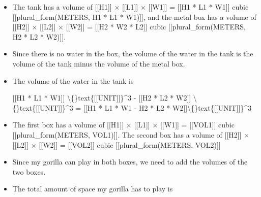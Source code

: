 \documentclass{article}
\begin{document}
{{\begin{itemize}
                        One solution would be:
                        ([[getPrimeFactorization(WIDTH).join("\textbackslash\{\}\textbackslash\{\}space\textbackslash\{\}\textbackslash\{\}color\{black\}\{\textbackslash\{\}$\times$\}\textbackslash\{\}\textbackslash\{\}space")]]),
                        ([[getPrimeFactorization(LENGTH).join("\textbackslash\{\}\textbackslash\{\}space\textbackslash\{\}\textbackslash\{\}color\{black\}\{\textbackslash\{\}$\times$\}\textbackslash\{\}\textbackslash\{\}space")]]) and
                        ([[getPrimeFactorization(HEIGHT).join("\textbackslash\{\}\textbackslash\{\}space\textbackslash\{\}\textbackslash\{\}color\{black\}\{\textbackslash\{\}$\times$\}\textbackslash\{\}\textbackslash\{\}space")]])
                    
                    
                        So the dimensions of the box could be [[WIDTH]],
                        [[LENGTH]] and [[HEIGHT]].
  \item The tank has a volume of [[H1]] $\times$ [[L1]] $\times$ [[W1]] = 
                        [[H1 * L1 * W1]] cubic [[plural\_form(METERS, H1 * L1 * W1)]],
                        and the metal box has a volume of [[H2]] $\times$ [[L2]] $\times$ [[W2]] = 
                        [[H2 * W2 * L2]] cubic [[plural\_form(METERS, H2 * L2 * W2)]].
  \item Since there is no water in the box, the volume of the water in the tank is the volume of the tank minus the volume of the metal box.
  \item The volume of the water in the tank is 
                    
                        [[H1 * L1 * W1]] \textbackslash\{\}text\{[[UNIT]]\}\textasciicircum{}3 -
                        [[H2 * L2 * W2]] \textbackslash\{\}text\{[[UNIT]]\}\textasciicircum{}3 = 
                        [[H1 * L1 * W1 - H2 * L2 * W2]]\textbackslash\{\}text\{[[UNIT]]\}\textasciicircum{}3
  \item The first box has a volume of [[H1]] $\times$ [[L1]] $\times$ [[W1]] = 
                        [[VOL1]] cubic [[plural\_form(METERS, VOL1)]].
                        The second box has a volume of [[H2]] $\times$ [[L2]] $\times$ [[W2]] = 
                        [[VOL2]] cubic [[plural\_form(METERS, VOL2)]]
  \item Since my gorilla can play in both boxes, we need to add the volumes of the two boxes.
  \item The total amount of space my gorilla has to play is 
                    

\end{itemize}}}
\end{document}
